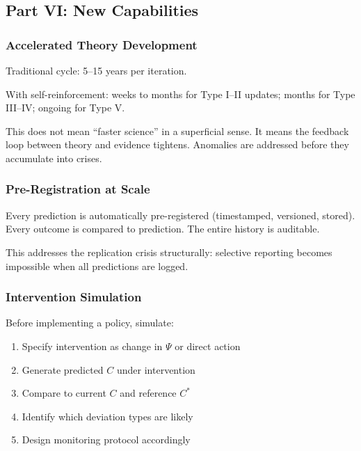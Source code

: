 \subsection{Part VI: New Capabilities}

\subsubsection{Accelerated Theory Development}

Traditional cycle: 5--15 years per iteration.

With self-reinforcement: weeks to months for Type I--II updates; months for 
Type III--IV; ongoing for Type V.

This does not mean ``faster science'' in a superficial sense. It means the 
feedback loop between theory and evidence tightens. Anomalies are addressed 
before they accumulate into crises.

\subsubsection{Pre-Registration at Scale}

Every prediction is automatically pre-registered (timestamped, versioned, 
stored). Every outcome is compared to prediction. The entire history is 
auditable.

This addresses the replication crisis structurally: selective reporting becomes 
impossible when all predictions are logged.

\subsubsection{Intervention Simulation}

Before implementing a policy, simulate:
\begin{enumerate}
    \item Specify intervention as change in $\Psi$ or direct action
    \item Generate predicted $C$ under intervention
    \item Compare to current $C$ and reference $C^*$
    \item Identify which deviation types are likely
    \item Design monitoring protocol accordingly
\end{enumerate}

